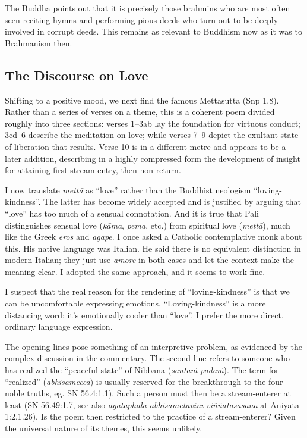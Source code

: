 \documentclass[12pt,openany]{book}%
\begin{document}
The Buddha points out that it is precisely those brahmins who are most often seen reciting hymns and performing pious deeds who turn out to be deeply involved in corrupt deeds. This remains as relevant to Buddhism now as it was to Brahmanism then.

\subsection*{The Discourse on Love}

Shifting to a positive mood, we next find the famous Mettasutta (Snp 1.8). Rather than a series of verses on a theme, this is a coherent poem divided roughly into three sections: verses 1–3ab lay the foundation for virtuous conduct; 3cd–6 describe the meditation on love; while verses 7–9 depict the exultant state of liberation that results. Verse 10 is in a different metre and appears to be a later addition, describing in a highly compressed form the development of insight for attaining first stream-entry, then non-return.

I now translate \textit{\textsanskrit{mettā}} as “love” rather than the Buddhist neologism “loving-kindness”. The latter has become widely accepted and is justified by arguing that “love” has too much of a sensual connotation. And it is true that Pali distinguishes sensual love (\textit{\textsanskrit{kāma}}, \textit{pema}, etc.) from spiritual love (\textit{\textsanskrit{mettā}}), much like the Greek \emph{eros} and \emph{agape}. I once asked a Catholic contemplative monk about this. His native language was Italian. He said there is no equivalent distinction in modern Italian; they just use \emph{amore} in both cases and let the context make the meaning clear. I adopted the same approach, and it seems to work fine.

I suspect that the real reason for the rendering of “loving-kindness” is that we can be uncomfortable expressing emotions. “Loving-kindness” is a more distancing word; it’s emotionally cooler than “love”. I prefer the more direct, ordinary language expression.

The opening lines pose something of an interpretive problem, as evidenced by the complex discussion in the commentary. The second line refers to someone who has realized the “peaceful state” of \textsanskrit{Nibbāna} (\textit{\textsanskrit{santaṁ} \textsanskrit{padaṁ}}). The term for “realized” (\textit{abhisamecca}) is usually reserved for the breakthrough to the four noble truths, eg. SN 56.4:1.1). Such a person must then be a stream-enterer at least (SN 56.49:1.7, see also \textit{\textsanskrit{āgataphalā} \textsanskrit{abhisametāvinī} \textsanskrit{viññātasāsanā}} at Aniyata 1:2.1.26). Is the poem then restricted to the practice of a stream-enterer? Given the universal nature of its themes, this seems unlikely.
\end{document}

